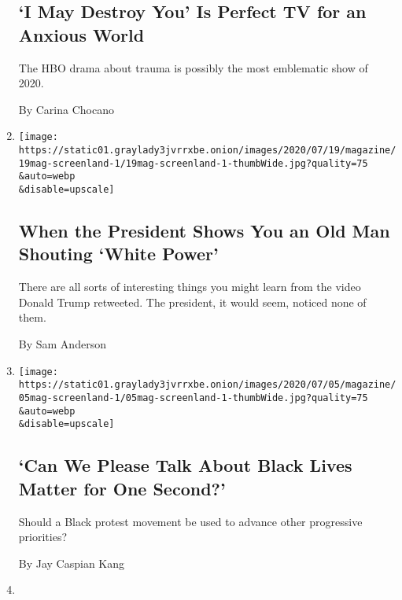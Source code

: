 \begin{enumerate}
  \hypertarget{i-may-destroy-you-is-perfect-tv-for-an-anxious-world}{%
  \subsection{`I May Destroy You' Is Perfect TV for an Anxious
  World}\label{i-may-destroy-you-is-perfect-tv-for-an-anxious-world}}

  The HBO drama about trauma is possibly the most emblematic show of
  2020.

  By Carina Chocano
\item
  \href{/2020/07/15/magazine/trump-white-power-tweet.html}{}

  \texttt{[image: https://static01.graylady3jvrrxbe.onion/images/2020/07/19/magazine/19mag-screenland-1/19mag-screenland-1-thumbWide.jpg?quality=75\\\&auto=webp\\\&disable=upscale]}

  \hypertarget{when-the-president-shows-you-an-old-man-shouting-white-power}{%
  \subsection{When the President Shows You an Old Man Shouting `White
  Power'}\label{when-the-president-shows-you-an-old-man-shouting-white-power}}

  There are all sorts of interesting things you might learn from the
  video Donald Trump retweeted. The president, it would seem, noticed
  none of them.

  By Sam Anderson
\item
  \href{/2020/07/02/magazine/can-we-please-talk-about-black-lives-matter-for-one-second.html}{}

  \texttt{[image: https://static01.graylady3jvrrxbe.onion/images/2020/07/05/magazine/05mag-screenland-1/05mag-screenland-1-thumbWide.jpg?quality=75\\\&auto=webp\\\&disable=upscale]}

  \hypertarget{can-we-please-talk-about-black-lives-matter-for-one-second}{%
  \subsection{`Can We Please Talk About Black Lives Matter for One
  Second?'}\label{can-we-please-talk-about-black-lives-matter-for-one-second}}

  Should a Black protest movement be used to advance other progressive
  priorities?

  By Jay Caspian Kang
\item
  \href{/2020/06/25/magazine/sarah-cooper-doesnt-mimic-trump-she-exposes-him.html}{}


\end{enumerate}

